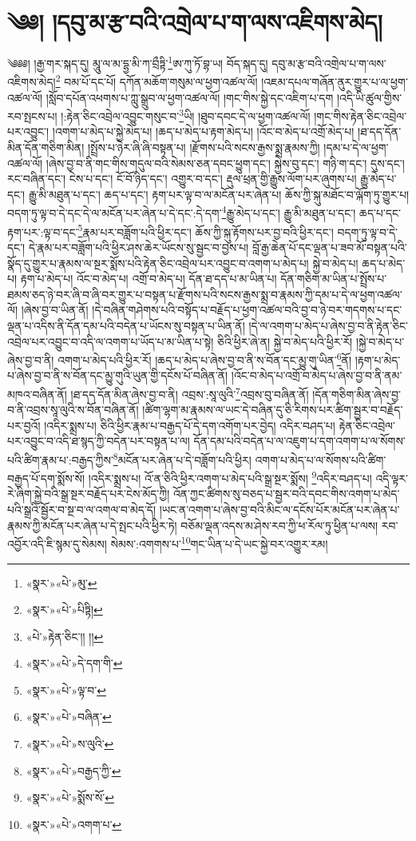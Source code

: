 \chapter{༄༅། །དབུ་མ་རྩ་བའི་འགྲེལ་པ་ག་ལས་འཇིགས་མེད།}༄༅༅། །རྒྱ་གར་སྐད་དུ། མཱུ་ལ་མ་དྷྱ་མི་ཀ་བྲྀཏྟི་\footnote{«སྣར་»«པེ་»མུ་}ཨ་ཀུ་ཏོ་བྷ་ཡ། བོད་སྐད་དུ། དབུ་མ་རྩ་བའི་འགྲེལ་པ་ག་ལས་འཇིགས་མེད།\footnote{«སྣར་»«པེ་»པིཏྟི།} བམ་པོ་དང་པོ། དཀོན་མཆོག་གསུམ་ལ་ཕྱག་འཚལ་ལོ། །འཇམ་དཔལ་གཞོན་ནུར་གྱུར་པ་ལ་ཕྱག་འཚལ་ལོ། །སློབ་དཔོན་འཕགས་པ་ཀླུ་སྒྲུབ་ལ་ཕྱག་འཚལ་ལོ། །གང་གིས་སྐྱེ་དང་འཇིག་པ་དག །འདི་ཡི་ཚུལ་གྱིས་རབ་སྤངས་པ། །:རྟེན་ཅིང་འབྲེལ་འབྱུང་གསུང་བ་\footnote{«པེ་»རྟེན་ཅིང་།། །།}ཡི། །ཐུབ་དབང་དེ་ལ་ཕྱག་འཚལ་ལོ། །གང་གིས་རྟེན་ཅིང་འབྲེལ་པར་འབྱུང་། །འགག་པ་མེད་པ་སྐྱེ་མེད་པ། །ཆད་པ་མེད་པ་རྟག་མེད་པ། །འོང་བ་མེད་པ་འགྲོ་མེད་པ། །ཐ་དད་དོན་མིན་དོན་གཅིག་མིན། །སྤྲོས་པ་ཉེར་ཞི་ཞི་བསྟན་པ། །རྫོགས་པའི་སངས་རྒྱས་སྨྲ་རྣམས་ཀྱི། །དམ་པ་དེ་ལ་ཕྱག་འཚལ་ལོ། །ཞེས་བྱ་བ་ནི་གང་གིས་གདུལ་བའི་སེམས་ཅན་དབང་ཕྱུག་དང་། སྐྱེས་བུ་དང་། གཉི་ག་དང་། དུས་དང་། རང་བཞིན་དང་། ངེས་པ་དང་། ངོ་བོ་ཉིད་དང་། འགྱུར་བ་དང་། རྡུལ་ཕྲན་གྱི་རྒྱུས་ལོག་པར་ཞུགས་པ། རྒྱུ་མེད་པ་དང་། རྒྱུ་མི་མཐུན་པ་དང་། ཆད་པ་དང་། རྟག་པར་ལྟ་བ་ལ་མངོན་པར་ཞེན་པ། ཆོས་ཀྱི་སྐུ་མཐོང་བ་ལྐོག་ཏུ་གྱུར་པ། བདག་ཏུ་ལྟ་བ་དེ་དང་དེ་ལ་མངོན་པར་ཞེན་པ་དེ་དང་:དེ་དག་\footnote{«སྣར་»«པེ་»དེ་དག་གི་}རྒྱུ་མེད་པ་དང་། རྒྱུ་མི་མཐུན་པ་དང་། ཆད་པ་དང་རྟག་པར་:ལྟ་བ་དང་\footnote{«སྣར་»«པེ་»ལྟ་བ་}རྣམ་པར་བཟློག་པའི་ཕྱིར་དང་། ཆོས་ཀྱི་སྐུ་རྟོགས་པར་བྱ་བའི་ཕྱིར་དང་། བདག་ཏུ་ལྟ་བ་དེ་དང་། དེ་རྣམ་པར་བཟློག་པའི་ཕྱིར་ཤས་ཆེར་ཡོངས་སུ་སྦྱང་བ་བྱས་པ། བློ་རྒྱ་ཆེན་པོ་དང་ལྡན་པ་ཟབ་མོ་བསྟན་པའི་སྣོད་དུ་གྱུར་པ་རྣམས་ལ་སྔར་སྨོས་པའི་རྟེན་ཅིང་འབྲེལ་པར་འབྱུང་བ་འགག་པ་མེད་པ། སྐྱེ་བ་མེད་པ། ཆད་པ་མེད་པ། རྟག་པ་མེད་པ། འོང་བ་མེད་པ། འགྲོ་བ་མེད་པ། དོན་ཐ་དད་པ་མ་ཡིན་པ། དོན་གཅིག་མ་ཡིན་པ་སྤྲོས་པ་ཐམས་ཅད་ཉེ་བར་ཞི་བ་ཞི་བར་གྱུར་པ་བསྟན་པ་རྫོགས་པའི་སངས་རྒྱས་སྨྲ་བ་རྣམས་ཀྱི་དམ་པ་དེ་ལ་ཕྱག་འཚལ་ལོ། །ཞེས་བྱ་བ་ཡིན་ནོ། །དེ་བཞིན་གཤེགས་པའི་བསྟོད་པ་བརྗོད་པ་ཕྱག་འཚལ་བའི་བྱ་བ་ཉེ་བར་གདགས་པ་དང་ལྡན་པ་འདིས་ནི་དོན་དམ་པའི་བདེན་པ་ཡོངས་སུ་བསྟན་པ་ཡིན་ནོ། །དེ་ལ་འགག་པ་མེད་པ་ཞེས་བྱ་བ་ནི་རྟེན་ཅིང་འབྲེལ་པར་འབྱུང་བ་འདི་ལ་འགག་པ་ཡོད་པ་མ་ཡིན་པ་སྟེ། ཅིའི་ཕྱིར་ཞེ་ན། སྐྱེ་བ་མེད་པའི་ཕྱིར་རོ། །སྐྱེ་བ་མེད་པ་ཞེས་བྱ་བ་ནི། འགག་པ་མེད་པའི་ཕྱིར་རོ། །ཆད་པ་མེད་པ་ཞེས་བྱ་བ་ནི་ས་བོན་དང་མྱུ་གུ་ཡིན་\footnote{«སྣར་»«པེ་»བཞིན་}ནོ། །རྟག་པ་མེད་པ་ཞེས་བྱ་བ་ནི་ས་བོན་དང་མྱུ་གུའི་ཡུན་གྱི་དངོས་པོ་བཞིན་ནོ། །འོང་བ་མེད་པ་འགྲོ་བ་མེད་པ་ཞེས་བྱ་བ་ནི་ནམ་མཁའ་བཞིན་ནོ། །ཐ་དད་དོན་མིན་ཞེས་བྱ་བ་ནི། འབྲས་:སཱ་ལུའི་\footnote{«སྣར་»«པེ་»ས་ལུའི་}འབྲས་བུ་བཞིན་ནོ། །དོན་གཅིག་མིན་ཞེས་བྱ་བ་ནི་འབྲས་སཱ་ལུའི་ས་བོན་བཞིན་ནོ། །ཚིག་ལྷག་མ་རྣམས་ལ་ཡང་དེ་བཞིན་དུ་ཅི་རིགས་པར་ཚིག་སྦྱར་བ་བརྗོད་པར་བྱའོ། །འདིར་སྨྲས་པ། ཅིའི་ཕྱིར་རྣམ་པ་བརྒྱད་པོ་དེ་དག་འགོག་པར་བྱེད། འདིར་བཤད་པ། རྟེན་ཅིང་འབྲེལ་པར་འབྱུང་བ་འདི་ཐ་སྙད་ཀྱི་བདེན་པར་བསྟན་པ་ལ། དོན་དམ་པའི་བདེན་པ་ལ་འཇུག་པ་དག་འགག་པ་ལ་སོགས་པའི་ཚིག་རྣམ་པ་:བརྒྱད་ཀྱིས་\footnote{«སྣར་»«པེ་»བརྒྱད་ཀྱི་}མངོན་པར་ཞེན་པ་དེ་བཟློག་པའི་ཕྱིར། འགག་པ་མེད་པ་ལ་སོགས་པའི་ཚིག་བརྒྱད་པོ་དག་སྨོས་སོ། །འདིར་སྨྲས་པ། འོ་ན་ཅིའི་ཕྱིར་འགག་པ་མེད་པའི་སྒྲ་སྔར་སྨོས། \footnote{«སྣར་»«པེ་»སྨོས་སོ་}འདིར་བཤད་པ། འདི་ལྟར་རེ་ཞིག་སྐྱེ་བའི་སྒྲ་སྔར་བརྗོད་པར་ངེས་མོད་ཀྱི། འོན་ཀྱང་ཚིགས་སུ་བཅད་པ་སྦྱར་བའི་དབང་གིས་འགག་པ་མེད་པའི་སྒྲའི་སྦྱོར་བ་སྔ་བ་ལ་འགལ་བ་མེད་དོ། །ཡང་ན་འགག་པ་ཞེས་བྱ་བའི་མིང་ལ་དངོས་པོར་མངོན་པར་ཞེན་པ་རྣམས་ཀྱི་མངོན་པར་ཞེན་པ་དེ་སྤང་པའི་ཕྱིར་ཏེ། བཅོམ་ལྡན་འདས་མ་ཤེས་རབ་ཀྱི་ཕ་རོལ་ཏུ་ཕྱིན་པ་ལས། རབ་འབྱོར་འདི་ཇི་སྙམ་དུ་སེམས། སེམས་:འགགས་པ་\footnote{«སྣར་»«པེ་»འགག་པ་}གང་ཡིན་པ་དེ་ཡང་སྐྱེ་བར་འགྱུར་རམ། 
